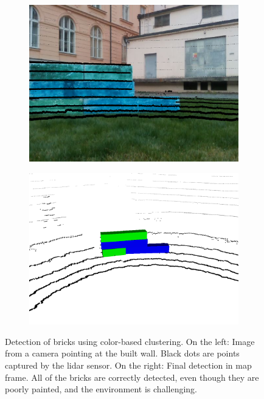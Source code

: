 \begin{figure}[H]
	
	\begin{subfigure}{0.49\textwidth}
		\centering
		\includegraphics[scale=0.19]{fig/colors_camera}
	\end{subfigure}
	\begin{subfigure}{0.49\textwidth}
		\centering
		\includegraphics[scale=0.18]{fig/colors_lidar}
	\end{subfigure}
	
	\caption[Colored pointcloud detections]{Detection of bricks using color-based clustering. On the left: Image from a camera pointing at the built wall. Black dots are points captured by the lidar sensor. On the right: Final detection in map frame. All of the bricks are correctly detected, even though they are poorly painted, and the environment is challenging.}
	\label{fig:colors}
\end{figure}

\newpage
